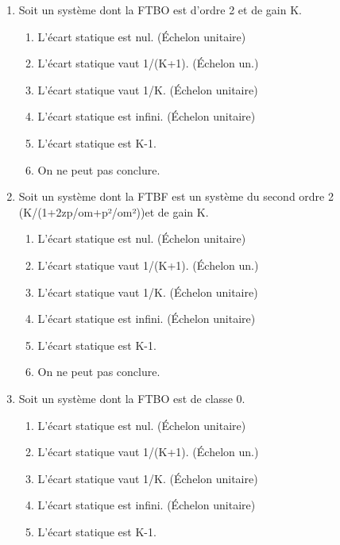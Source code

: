 \documentclass[10pt,fleqn]{article} %
\begin{document}
\def\pathfig{images}

\vspace{4.5cm}
\pagestyle{fancy}
\thispagestyle{plain}

\def\columnseprulecolor{\color{ocre}}
\setlength{\columnseprule}{0.4pt} 

\def\pathfig{images}

\begin{multicols}{2}
\begin{enumerate}
\item Soit un système dont la FTBO est d'ordre 2 et de gain K.
\begin{enumerate}
\item L'écart statique est nul. (Échelon unitaire)
\item L'écart statique vaut 1/(K+1). (Échelon un.)
\item L'écart statique vaut 1/K. (Échelon unitaire)
\item L'écart statique est infini. (Échelon unitaire)
\item L'écart statique est K-1.
\item On ne peut pas conclure. %
\end{enumerate}
\item Soit un système dont la FTBF est un système du second ordre 2 (K/(1+2zp/om+p²/om²))et de gain K.
\begin{enumerate}
\item L'écart statique est nul. (Échelon unitaire)
\item L'écart statique vaut 1/(K+1). (Échelon un.)
\item L'écart statique vaut 1/K. (Échelon unitaire)
\item L'écart statique est infini. (Échelon unitaire)
\item L'écart statique est K-1.%
\item On ne peut pas conclure. 
\end{enumerate}
\item Soit un système dont la FTBO est de classe 0.
\begin{enumerate}
\item L'écart statique est nul. (Échelon unitaire)
\item L'écart statique vaut 1/(K+1). (Échelon un.) %
\item L'écart statique vaut 1/K. (Échelon unitaire) 
\item L'écart statique est infini. (Échelon unitaire)
\item L'écart statique est K-1.

\end{enumerate}
\end{enumerate}
\end{multicols}
\end{document}
